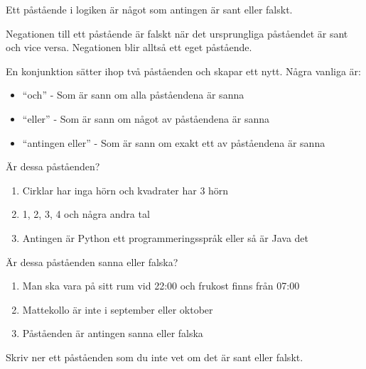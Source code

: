 
\begin{definition}[Påstående]
	Ett påstående i logiken är något som antingen är sant eller falskt.
\end{definition}


\begin{definition}[Negation]
	Negationen till ett påstående är falskt när det ursprungliga påståendet är sant och vice versa. Negationen blir alltså ett eget påstående.
\end{definition}

\begin{definition}[Konjunktion]
	En konjunktion sätter ihop två påståenden och skapar ett nytt. Några vanliga är:
	\begin{itemize}
		\item ``och'' - Som är sann om alla påståendena är sanna
		\item ``eller'' - Som är sann om något av påståendena är sanna
		\item ``antingen eller'' - Som är sann om exakt ett av påståendena är sanna
	\end{itemize}
\end{definition}

\begin{problem}
	Är dessa påståenden?
	\begin{enumerate}
		\item Cirklar har inga hörn och kvadrater har 3 hörn
		\item 1, 2, 3, 4 och några andra tal
		\item Antingen är Python ett programmeringsspråk eller så är Java det
	\end{enumerate}
\end{problem}


\begin{problem}
	Är dessa påståenden sanna eller falska?
	\begin{enumerate}
		\item Man ska vara på sitt rum vid 22:00 och frukost finns från 07:00
		\item Mattekollo är inte i september eller oktober
		\item Påståenden är antingen sanna eller falska
	\end{enumerate}
\end{problem} 


\begin{problem}
	Skriv ner ett påståenden som du inte vet om det är sant eller falskt.
\end{problem}

